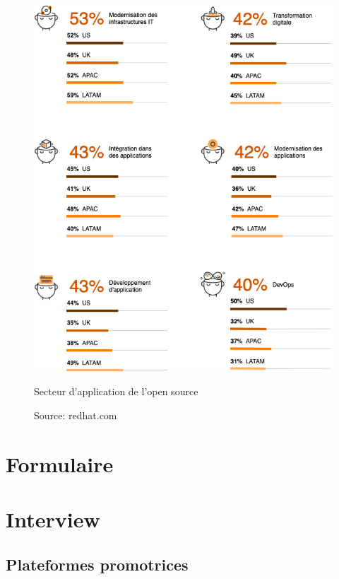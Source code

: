 \begin{appendices}
\begin{figure}[h]
	\center
	\includegraphics[scale=0.65]{./img/Use_os.png}
	\caption{Secteur d'application de l'open source}
	\caption*{\color{silver}Source: redhat.com}					
\end{figure}

\chapter{Formulaire}
\chapter{Interview}

\section{Plateformes promotrices}


\end{appendices}
